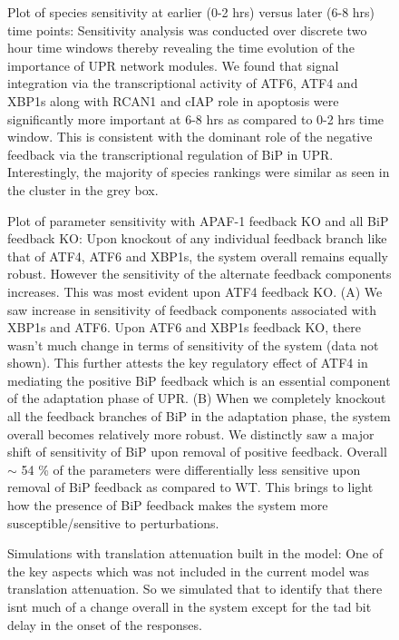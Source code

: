 \documentclass[fleqn,10pt]{wlscirep}
\begin{document}
\begin{figure}\centering
	\caption{Plot of species sensitivity at earlier (0-2 hrs) versus later (6-8 hrs) time points: Sensitivity analysis was conducted over discrete two hour time windows thereby revealing the time evolution of the importance of UPR network modules. We found that signal integration via the transcriptional activity of ATF6, ATF4 and XBP1s along with RCAN1 and cIAP role in apoptosis were significantly more important at 6-8 hrs as compared to 0-2 hrs time window. This is consistent with the dominant role of the negative feedback via the transcriptional regulation of BiP in UPR. Interestingly, the majority of species rankings were similar as seen in the cluster in the grey box.}
	\label{fg:Sens_S1}
\end{figure}

\begin{figure}\centering
	\caption{Plot of parameter sensitivity with APAF-1 feedback KO and all BiP feedback KO: Upon knockout of any individual feedback branch like that of ATF4, ATF6 and XBP1s, the system overall remains equally robust. However the sensitivity of the alternate feedback components increases. This was most evident upon ATF4 feedback KO.
	(A) We saw increase in sensitivity of feedback components associated with XBP1s and ATF6. Upon ATF6 and XBP1s feedback KO, there wasn't much change in terms of sensitivity of the system (data not shown). This further attests the key regulatory effect of ATF4 in mediating the positive BiP feedback which is an essential component of the adaptation phase of UPR.
	(B) When we completely knockout all the feedback branches of BiP in the adaptation phase, the system overall becomes relatively more robust. We distinctly saw a major shift of sensitivity of BiP upon removal of positive feedback. Overall $\sim$ 54 \% of the parameters were differentially less sensitive upon removal of BiP feedback as compared to WT. This brings to light how the presence of BiP feedback makes the system more susceptible/sensitive to perturbations.}
	\label{fg:Sens_S3}
\end{figure}

\begin{figure}\centering
	\caption{Simulations with translation attenuation built in the model: One of the key aspects which was not included in the current model was translation attenuation. So we simulated that to identify that there isnt much of a change overall in the system except for the tad bit delay in the onset of the responses. }
	\label{fg:Trans_S1}
\end{figure}
\end{document}
